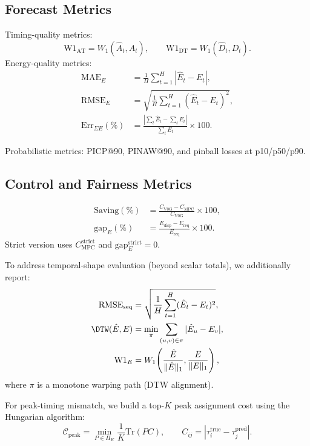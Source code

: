\documentclass[journal]{IEEEtran}
\newcommand{\AT}{\mathrm{AT}}
\newcommand{\DT}{\mathrm{DT}}
\newcommand{\Wone}{\mathrm{W1}}
\newcommand{\RMSE}{\mathrm{RMSE}}
\newcommand{\MAE}{\mathrm{MAE}}
\begin{document}
\subsection{Forecast Metrics}
Timing-quality metrics:
\begin{equation}
\Wone_{\AT}=W_1(\hat{A}_t,A_t),\qquad \Wone_{\DT}=W_1(\hat{D}_t,D_t).
\end{equation}
Energy-quality metrics:
\begin{align}
\MAE_E &= \frac{1}{H}\sum_{t=1}^{H}|\hat{E}_t-E_t|,\\
\RMSE_E &= \sqrt{\frac{1}{H}\sum_{t=1}^{H}(\hat{E}_t-E_t)^2},\\
\mathrm{Err}_{\Sigma E}(\%) &= \frac{|\sum_t\hat{E}_t-\sum_tE_t|}{\sum_tE_t}\times 100.
\end{align}

Probabilistic metrics: PICP@90, PINAW@90, and pinball losses at p10/p50/p90.

\subsection{Control and Fairness Metrics}
\begin{align}
\mathrm{Saving}(\%) &= \frac{C_{\mathrm{V0G}}-C_{\mathrm{MPC}}}{C_{\mathrm{V0G}}}\times 100,\\
\mathrm{gap}_E(\%) &= \frac{E_{\mathrm{disp}}-E_{\mathrm{req}}}{E_{\mathrm{req}}}\times 100.
\end{align}
Strict version uses $C_{\mathrm{MPC}}^{\mathrm{strict}}$ and $\mathrm{gap}_E^{\mathrm{strict}}=0$.

To address temporal-shape evaluation (beyond scalar totals), we additionally report:
\begin{align}
\RMSE_{\mathrm{seq}} &= \sqrt{\frac{1}{H}\sum_{t=1}^{H}(\hat{E}_t-E_t)^2},\\
\DTW(\hat{E},E) &= \min_{\pi}\sum_{(u,v)\in\pi}|\hat{E}_u-E_v|,\\
\Wone_E &= W_1\!\left(\frac{\hat{E}}{\|\hat{E}\|_1},\frac{E}{\|E\|_1}\right),
\end{align}
where $\pi$ is a monotone warping path (DTW alignment).

For peak-timing mismatch, we build a top-$K$ peak assignment cost using the Hungarian algorithm:
\begin{equation}
\mathcal{C}_{\mathrm{peak}} = \min_{P\in\Pi_K}\frac{1}{K}\mathrm{Tr}(PC),\qquad C_{ij}=|\tau^{\mathrm{true}}_i-\tau^{\mathrm{pred}}_j|.
\end{equation}
\end{document}
